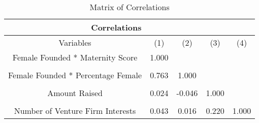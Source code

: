 \begin{table}[htbp]\centering
    \caption{Matrix of Correlations}
    \begin{tabular}{c c c c c}
    \toprule
    \multicolumn{4}{c}{\textbf{Correlations}}  \\
    \midrule
    Variables      &      (1)      &     (2)      &      (3)      &     (4)\\
    \midrule
    Female Founded * Maternity Score     &    1.000   &               &        &       \\

                &               &                     &        &       \\
    Female Founded * Percentage Female    & 0.763    &     1.000      &           &       \\
                &               &                   &          &       \\
    Amount Raised               &     0.024    &       -0.046        &     1.000     &       \\
                &               &                     &            &       \\
    Number of Venture Firm Interests       &     0.043   &      0.016       &      0.220     &    1.000 \\
    \bottomrule
    \end{tabular}
\end{table}